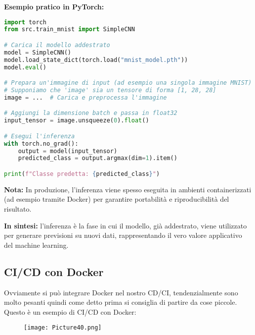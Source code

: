 \documentclass[a4paper,12pt]{article}
\begin{document}
\textbf{Esempio pratico in PyTorch:}
\begin{lstlisting}[language=Python, basicstyle=\ttfamily\footnotesize, breaklines=true, frame=single]
import torch
from src.train_mnist import SimpleCNN

# Carica il modello addestrato
model = SimpleCNN()
model.load_state_dict(torch.load("mnist_model.pth"))
model.eval()

# Prepara un'immagine di input (ad esempio una singola immagine MNIST)
# Supponiamo che 'image' sia un tensore di forma [1, 28, 28]
image = ...  # Carica e preprocessa l'immagine

# Aggiungi la dimensione batch e passa in float32
input_tensor = image.unsqueeze(0).float()

# Esegui l'inferenza
with torch.no_grad():
    output = model(input_tensor)
    predicted_class = output.argmax(dim=1).item()

print(f"Classe predetta: {predicted_class}")
\end{lstlisting}

\textbf{Nota:} In produzione, l'inferenza viene spesso eseguita in ambienti containerizzati (ad esempio tramite Docker) per garantire portabilità e riproducibilità del risultato.

\textbf{In sintesi:} l'inferenza è la fase in cui il modello, già addestrato, viene utilizzato per generare previsioni su nuovi dati, rappresentando il vero valore applicativo del machine learning.

\subsection{CI/CD con Docker}
Ovviamente si può integrare Docker nel nostro CD/CI, tendenzialmente sono molto pesanti quindi come detto prima si consiglia di partire da cose piccole. Questo è un esempio di CI/CD con Docker:
\begin{figure}[H]
    \centering
    \texttt{[image: Picture40.png]}
\end{figure}
\newpage
\end{document}
